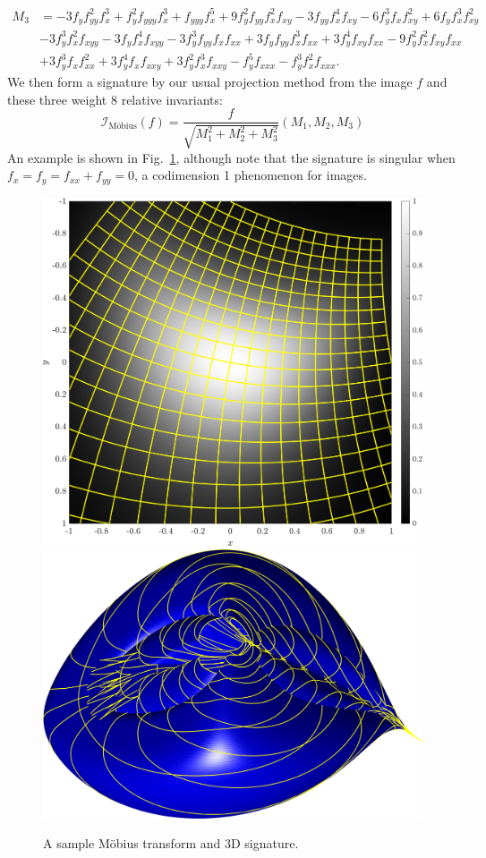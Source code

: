 \documentclass[review,onefignum,onetabnum]{siamonline190516}
\begin{document}
\begin{align*}
M_3&=-3 f_y  f_{yy}^2 f_x ^3 + 
 f_y ^2 f_{yyy} f_x ^3 + f_{yyy} f_x ^5 + 
 9 f_y ^2 f_{yy} f_x ^2 f_{xy} - 
 3 f_{yy} f_x ^4 f_{xy} - 6 f_y ^3 f_x  f_{xy}^2 + 
 6 f_y  f_x ^3 f_{xy}^2 \\ \nonumber
&- 3 f_y ^3 f_x ^2 f_{xyy} - 
 3 f_y  f_x ^4 f_{xyy} - 3 f_y ^3 f_{yy} f_x  f_{xx} + 
 3 f_y  f_{yy} f_x ^3 f_{xx} + 3 f_y ^4 f_{xy} f_{xx} - 
 9 f_y ^2 f_x ^2 f_{xy} f_{xx} \\ \nonumber
 &+ 3 f_y ^3 f_x  f_{xx}^2 + 3 f_y ^4 f_x  f_{xxy} + 
 3 f_y ^2 f_x ^3 f_{xxy} - f_y ^5 f_{xxx} - 
 f_y ^3 f_x ^2 f_{xxx}.
\end{align*}
We then form a signature by our usual projection method from the image $f$
and these three weight $8$ relative invariants:
\begin{equation}
    \label{eq:mobiussignature}
    \mathcal{I}_{\text{M\"obius}}(f) = \frac{f}{\sqrt{M_1^2 + M_2^2 +
    M_3^2}} (M_1, M_2, M_3)
\end{equation}
An example is shown in Fig.~\ref{fig:mobius}, although note that the
signature is singular when $f_x=f_y=f_{xx}+f_{yy}=0$, a codimension 1
phenomenon for images. 
\begin{figure}
\centering
\includegraphics[width=.45\textwidth]{Figs/f_transformed_Mobius.png}
\includegraphics[width=.45\textwidth]{Figs/Mobius_signature.png}
\caption{A sample M\"obius transform and 3D signature.}
\label{fig:mobius}
\end{figure}

\end{document}

